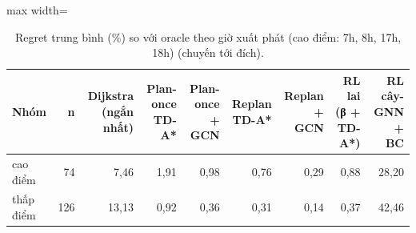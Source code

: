 \begin{table}[!htbp]
\centering
\small
\caption{Regret trung bình (\%) so với oracle theo giờ xuất phát (cao điểm: 7h, 8h, 17h, 18h) (chuyến tới đích).}
\label{tab:tab_by_peak}
\begin{adjustbox}{max width=\linewidth}
\begin{tabular}{lrrrrrrrr}
\toprule
Nhóm & n & Dijkstra (ngắn nhất) & Plan-once TD-A* & Plan-once + GCN & Replan TD-A* & Replan + GCN & RL lai (β + TD-A*) & RL cây-GNN + BC \\
\midrule
cao điểm & 74 & 7{,}46 & 1{,}91 & 0{,}98 & 0{,}76 & 0{,}29 & 0{,}88 & 28{,}20 \\
thấp điểm & 126 & 13{,}13 & 0{,}92 & 0{,}36 & 0{,}31 & 0{,}14 & 0{,}37 & 42{,}46 \\
\bottomrule
\end{tabular}
\end{adjustbox}
\end{table}
